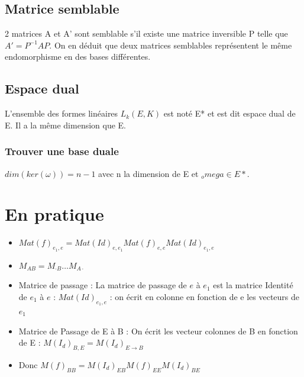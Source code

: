 \documentclass[french]{yLectureNote}
\begin{document}
\subsection{Matrice semblable}
\begin{definition}
2 matrices A et A' sont semblable s'il existe une matrice inversible P telle que \(A' = P^{-1}AP\). On en déduit que deux matrices semblables représentent le même endomorphisme en des bases différentes.
\end{definition}

\subsection{Espace dual}
\begin{definition}
L'ensemble des formes linéaires \(L_k(E, K)\) est noté E* et est dit espace dual de E. Il a la m\^eme dimension que E.
\end{definition}
\subsubsection{Trouver une base duale}
\begin{proposition}
\(dim(ker(\omega)) = n-1\) avec n la dimension de E et \(_omega \in E*\).
\end{proposition}
\section{En pratique}
\begin{itemize}
 \item \(Mat(f)_{e_1,e} = Mat(Id)_{e,e_1}Mat(f)_{e,e}Mat(Id)_{e_1,e}\)
 \item \(M_{AB} = M_{\cdot B}\dots M_{A\cdot}\)
 \item Matrice de passage : La matrice de passage de \(e\) à \(e_1\) est la matrice Identité de \(e_1\) à \(e\) : \(Mat(Id)_{e_1,e}\) : on écrit en colonne en fonction de e les vecteurs de \(e_1\)
 \item Matrice de Passage de E à B : On écrit les vecteur colonnes de B en fonction de E : \(M(I_d)_{B,E} = M(I_d)_{E\to B}\)
 \item Donc \(M(f)_{BB} = M(I_d)_{EB}M(f)_{EE}M(I_d)_{BE}\)
\end{itemize}
\end{document}
